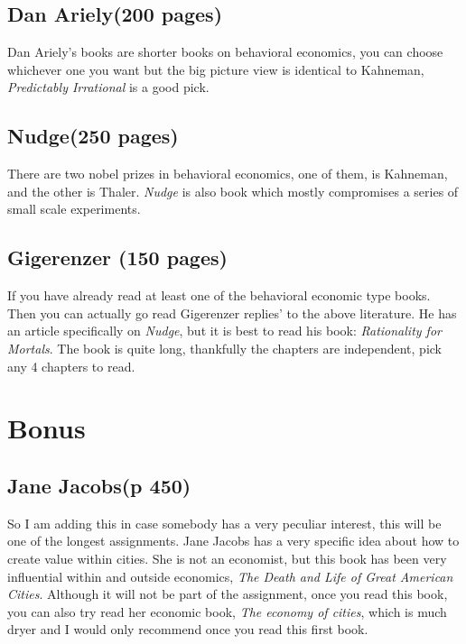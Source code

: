\documentclass[12pt]{report}
\numberwithin{equation}{section}
\begin{document}
\subsection*{Dan Ariely(200 pages)}

Dan Ariely's books are shorter books on behavioral economics, you can choose whichever one you want but the big picture view is identical to Kahneman, \textit{Predictably Irrational} is a good pick.  

\subsection*{Nudge(250 pages)}

There are two nobel prizes in behavioral economics, one of them, is Kahneman, and the other is Thaler. \textit{Nudge} is also book which mostly compromises a series of small scale experiments. 

\subsection*{Gigerenzer (150 pages)}

If you have already read at least one of the behavioral economic type books. Then you can actually go read Gigerenzer replies' to the above literature. He has an article specifically on \textit{Nudge}, but it is best to read his book: \textit{Rationality for Mortals}. The book is quite long, thankfully the chapters are independent, pick any 4 chapters to read.


\newpage
\section*{Bonus}
\subsection*{ Jane Jacobs(p 450)}

So I am adding this in case somebody has a very peculiar interest, this will be one of the longest assignments. Jane Jacobs has a very specific idea about how to create value within cities. She is not an economist, but this book has been very influential within and outside economics, \textit{The Death and Life of Great American Cities}. Although it will not be part of the assignment, once you read this book, you can also try read her economic book, \textit{The economy of cities}, which is much dryer and I would only recommend once you read this first book. 
\end{document}
